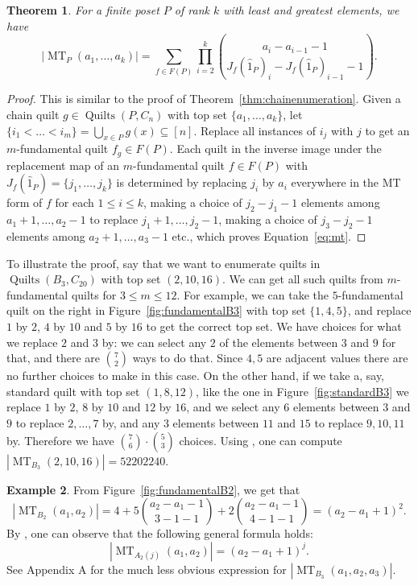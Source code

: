 \documentclass[12pt]{amsart}
\numberwithin{equation}{section}
\newtheorem{theorem}{Theorem}[section]
\theoremstyle{definition}
\newtheorem{example}[theorem]{Example}
\newcommand{\MT}{\operatorname{MT}}
\newcommand{\quilt}{\operatorname{Quilts}}
\begin{document}
\begin{theorem} \label{thm:mt}
 For a finite poset $P$ of rank $k$ with least and greatest elements,
we have \begin{equation} \label{eq:mt} |\MT_P(a_1,\ldots,a_k)| =
\sum_{f \in F(P)} \prod_{i=2}^k \binom{a_i-a_{i-1}-1}{J_f(\hat 1_P)_i -
J_f(\hat 1_P)_{i-1}-1}. \end{equation} 
\end{theorem}

\begin{proof}
 This is similar to the proof of
Theorem~\ref{thm:chainenumeration}. Given a chain quilt $g \in
\quilt(P,C_n)$ with top set $\{a_1,\ldots,a_k \}$, let 
$\{i_1<\dots<i_m\} = \bigcup_{x \in P} g(x) \subseteq [n]$. 
Replace all instances of $i_j$ with $j$ to get an $m$-fundamental
quilt $f_{g} \in F(P)$.  Each quilt in the inverse image under the
replacement map of an $m$-fundamental quilt $ f \in F(P)$ with
$J_f(\hat 1_{P})=\{j_1,\ldots,j_k \}$ is determined by
replacing $j_{i}$  by $a_{i}$ everywhere in the MT form of $f$ for each
$1\leq i\leq k$, making 
a choice of
$j_2-j_1-1$ elements among $a_1+1,\ldots,a_2-1$ to replace
$j_{1}+1,\dotsc , j_{2}-1$, making a choice of
$j_3-j_2-1$ elements among $a_2+1,\ldots,a_3-1$ etc., which proves
Equation~\eqref{eq:mt}.
\end{proof}


To illustrate the proof, say that we want to enumerate quilts in
$\quilt(B_3,C_{20})$ with top set $(2,10,16)$.  We can get all such
quilts from $m$-fundamental quilts for $3 \leq m \leq 12$. For
example, we can take the $5$-fundamental quilt on the right in
Figure~\ref{fig:fundamentalB3} with top set $\{1,4,5 \}$, and replace $1$ by $2$, $4$ by $10$
and $5$ by $16$ to get the correct top set. We have choices for what
we replace $2$ and $3$ by: we can select any $2$ of the elements
between $3$ and $9$ for that, and there are $\binom{7}{2}$ ways to do
that.
Since $4,5$ are adjacent values there are no further choices to make in
this case.  
On the other hand, if we take a, say, standard quilt with top set
$(1,8,12)$, like the one in Figure~\ref{fig:standardB3} we replace $1$
by $2$, $8$ by $10$ and $12$ by $16$, and we select any $6$ elements
between $3$ and $9$ to replace $2,\ldots,7$ by, and any $3$ elements
between $11$ and $15$ to replace $9,10,11$ by. Therefore we have
$\binom 7 6 \cdot \binom 5 3$ choices.  Using , one can
compute $|\MT_{B_{3}}(2,10,16)|=52202240$.


\begin{example}
 From Figure~\ref{fig:fundamentalB2}, we get that
 $$|\MT_{B_2}(a_1,a_2)| = 4 + 5 \binom{a_2-a_1-1}{3-1-1} + 2
 \binom{a_2-a_1-1}{4-1-1} = (a_2-a_1+1)^2.$$
By , one can observe 
that the following general formula holds:
\[
|\MT_{A_2(j)}(a_1,a_2)| = (a_2-a_1+1)^j.
\]
See Appendix A for the much less obvious expression for $|\MT_{B_3}(a_1,a_2,a_3)|$.
\end{example}
\end{document}
